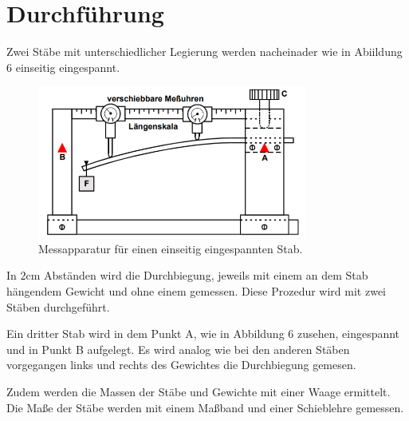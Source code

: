 \section{Durchführung}
\label{sec:Durchführung}


Zwei Stäbe mit unterschiedlicher Legierung werden nacheinader wie in Abiildung 6 einseitig eingespannt.

\begin{figure}[H]
  \centering
  \includegraphics[height=5cm]{einseitig.PNG}
  \caption{Messapparatur für einen einseitig eingespannten Stab. \cite{sample}}
  \label{fig:einseitig}
\end{figure}

In $2$cm Abständen wird die Durchbiegung, jeweils mit einem an dem Stab hängendem Gewicht
und ohne einem gemessen. Diese Prozedur wird mit zwei Stäben durchgeführt.

Ein dritter Stab wird in dem Punkt A, wie in Abbildung 6 zusehen, eingespannt und
in Punkt B aufgelegt. Es wird analog wie bei den anderen Stäben vorgegangen links
und rechts des Gewichtes die Durchbiegung gemesen.

Zudem werden die Massen der Stäbe und Gewichte mit einer Waage ermittelt. Die Maße der
Stäbe werden mit einem Maßband und einer Schieblehre gemessen.
